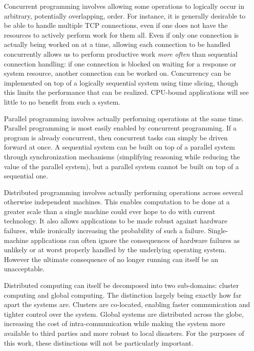 \documentclass[10pt,a4paper,twocolumn]{article}
\begin{document}
Concurrent programming involves allowing some operations to logically occur in
arbitrary, potentially overlapping, order. For instance, it is generally
desirable to be able to handle multiple TCP connections, even if one does not
have the resources to actively perform work for them all. Even if only one
connection is actually being worked on at a time, allowing each connection to be
handled concurrently allows us to perform productive work \emph{more often} than
sequential connection handling: if one connection is blocked on waiting for a
response or system resource, another connection can be worked on. Concurrency
can be implemented on top of a logically sequential system using time slicing,
though this limits the performance that can be realized. CPU-bound applications
will see little to no benefit from such a system.

Parallel programming involves actually performing operations at the same time.
Parallel programming is most easily enabled by concurrent programming. If a
program is already concurrent, then concurrent tasks can simply be driven
forward at once. A sequential system can be built on top of a parallel system
through synchronization mechanisms (simplifying reasoning while reducing the
value of the parallel system), but a parallel system cannot be built on top of a
sequential one.

Distributed programming involves actually performing operations across several
otherwise independent machines. This enables computation to be done at a greater
scale than a single machine could ever hope to do with current technology. It
also allows applications to be made robust against hardware failures, while
ironically increasing the probability of such a failure. Single-machine
applications can often ignore the consequences of hardware failures as unlikely
or at worst properly handled by the underlying operating system. However the
ultimate consequence of no longer running can itself be an unacceptable.

Distributed computing can itself be decomposed into two sub-domains: cluster
computing and global computing. The distinction largely being exactly how far
apart the systems are. Clusters are co-located, enabling faster communication
and tighter control over the system. Global systems are distributed across the
globe, increasing the cost of intra-communication while making the system more
available to third parties and more robust to local disasters. For the purposes
of this work, these distinctions will not be particularly important.
\end{document}

